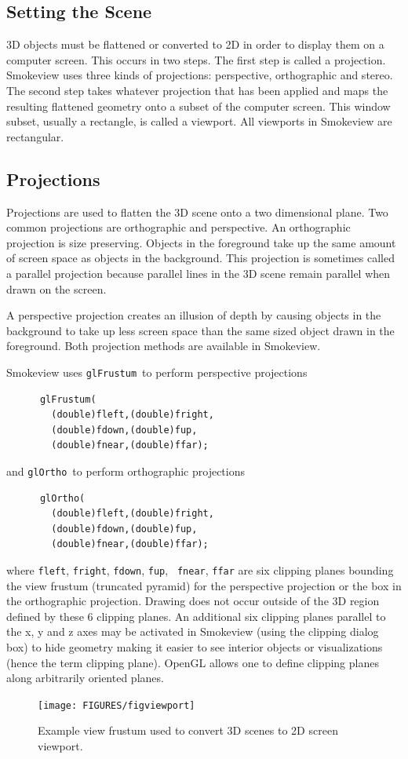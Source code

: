 \documentclass[11pt,twoside]{book}
\newcommand{\figoptions}{htp}
\begin{document}
\subsection{Setting the Scene}
3D objects must be flattened or converted to 2D in order to
display them on a computer screen.  This occurs in two steps.  The
first step is called a projection.  Smokeview uses three kinds of
projections: perspective, orthographic and stereo.  The second
step takes whatever projection that has been applied and maps the
resulting flattened geometry onto a subset of the computer screen.
This window subset, usually a rectangle, is called a viewport. All
viewports in Smokeview are rectangular.

\subsection{Projections}
Projections are used to flatten the 3D scene onto a two
dimensional plane. Two common projections are orthographic and
perspective. An orthographic projection is size preserving.
Objects in the foreground take up the same amount of screen space
as objects in the background. This projection is sometimes called
a parallel projection because parallel lines in the 3D scene
remain parallel when drawn on the screen.

A perspective projection creates an illusion of depth by causing
objects in the background to take up less screen space than the
same sized object drawn in the foreground.  Both projection
methods are available in Smokeview.

Smokeview uses {\tt glFrustum}\ to perform perspective projections
\begin{verbatim}
      glFrustum(
        (double)fleft,(double)fright,
        (double)fdown,(double)fup,
        (double)fnear,(double)ffar);
\end{verbatim}
and {\tt glOrtho}\ to perform orthographic projections
\begin{verbatim}
      glOrtho(
        (double)fleft,(double)fright,
        (double)fdown,(double)fup,
        (double)fnear,(double)ffar);
\end{verbatim}

\noindent where {\tt fleft}, {\tt fright}, {\tt fdown}, {\tt fup}, {\tt
fnear}, {\tt ffar} are six clipping planes bounding the view
frustum (truncated pyramid) for the perspective projection or the
box in the orthographic projection.  Drawing does not occur
outside of the 3D region defined by these 6 clipping planes. An
additional six clipping planes parallel to the x, y and z axes may
be activated in Smokeview (using the clipping dialog box) to hide
geometry making it easier to see interior objects or
visualizations (hence the term clipping plane).  OpenGL allows one to define clipping planes along
arbitrarily oriented planes.
\begin{figure}[\figoptions]
\begin{center}
\texttt{[image: FIGURES/figviewport]}
\end{center}
\caption{Example view frustum used to convert 3D scenes to 2D
screen viewport.}
 \label{figfrustum}
\end{figure}
\end{document}
